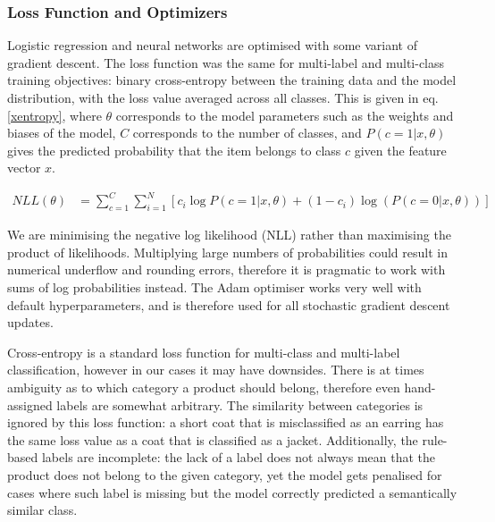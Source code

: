\subsubsection{Loss Function and Optimizers}
\label{loss}

Logistic regression and neural networks are optimised with some variant of gradient descent.
The loss function was the same for multi-label and multi-class training objectives: binary cross-entropy between the training data and the model distribution, with the loss value averaged across all classes.
This is given in eq. \ref{xentropy}, where $\theta$ corresponds to the model parameters such as the weights and biases of the model, $C$ corresponds to the number of classes, and $P(c=1|x, \theta)$ gives the predicted probability that the item belongs to class $c$ given the feature vector $x$.

\begin{align}
  \label{xentropy}
  NLL(\theta) &= \sum\limits_{c=1}^C \sum\limits_{i=1}^N\left[c_i\log P(c=1|x, \theta) + (1-c_i)\log(P(c=0|x, \theta) )\right]
\end{align}

We are minimising the negative log likelihood (NLL) rather than maximising the product of likelihoods.
Multiplying large numbers of probabilities could result in numerical underflow and rounding errors, therefore it is pragmatic to work with sums of log probabilities instead.
The Adam \cite{adam} optimiser works very well with default hyperparameters, and is therefore used for all stochastic gradient descent updates.

Cross-entropy is a standard loss function for multi-class and multi-label classification, however in our cases it may have downsides.
There is at times ambiguity as to which category a product should belong, therefore even hand-assigned labels are somewhat arbitrary.
The similarity between categories is ignored by this loss function: a short coat that is misclassified as an earring has the same loss value as a coat that is classified as a jacket.
Additionally, the rule-based labels are incomplete: the lack of a label does not always mean that the product does not belong to the given category, yet the model gets penalised for cases where such label is missing but the model correctly predicted a semantically similar class.

